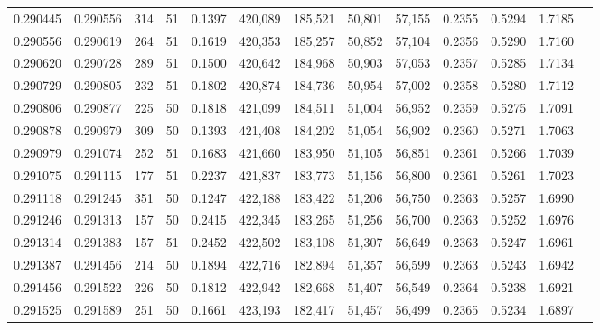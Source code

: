 \begin{tabular}{rrrrrrrrrrrrr}
0.290445 & 0.290556 &   314 &  51 &                                     0.1397 & 420,089 & 185,521 &  50,801 &  57,155 & 0.2355 & 0.5294 & 1.7185 \\
0.290556 & 0.290619 &   264 &  51 &                                     0.1619 & 420,353 & 185,257 &  50,852 &  57,104 & 0.2356 & 0.5290 & 1.7160 \\
0.290620 & 0.290728 &   289 &  51 &                                     0.1500 & 420,642 & 184,968 &  50,903 &  57,053 & 0.2357 & 0.5285 & 1.7134 \\
0.290729 & 0.290805 &   232 &  51 &                                     0.1802 & 420,874 & 184,736 &  50,954 &  57,002 & 0.2358 & 0.5280 & 1.7112 \\
0.290806 & 0.290877 &   225 &  50 &                                     0.1818 & 421,099 & 184,511 &  51,004 &  56,952 & 0.2359 & 0.5275 & 1.7091 \\
0.290878 & 0.290979 &   309 &  50 &                                     0.1393 & 421,408 & 184,202 &  51,054 &  56,902 & 0.2360 & 0.5271 & 1.7063 \\
0.290979 & 0.291074 &   252 &  51 &                                     0.1683 & 421,660 & 183,950 &  51,105 &  56,851 & 0.2361 & 0.5266 & 1.7039 \\
0.291075 & 0.291115 &   177 &  51 &                                     0.2237 & 421,837 & 183,773 &  51,156 &  56,800 & 0.2361 & 0.5261 & 1.7023 \\
0.291118 & 0.291245 &   351 &  50 &                                     0.1247 & 422,188 & 183,422 &  51,206 &  56,750 & 0.2363 & 0.5257 & 1.6990 \\
0.291246 & 0.291313 &   157 &  50 &                                     0.2415 & 422,345 & 183,265 &  51,256 &  56,700 & 0.2363 & 0.5252 & 1.6976 \\
0.291314 & 0.291383 &   157 &  51 &                                     0.2452 & 422,502 & 183,108 &  51,307 &  56,649 & 0.2363 & 0.5247 & 1.6961 \\
0.291387 & 0.291456 &   214 &  50 &                                     0.1894 & 422,716 & 182,894 &  51,357 &  56,599 & 0.2363 & 0.5243 & 1.6942 \\
0.291456 & 0.291522 &   226 &  50 &                                     0.1812 & 422,942 & 182,668 &  51,407 &  56,549 & 0.2364 & 0.5238 & 1.6921 \\
0.291525 & 0.291589 &   251 &  50 &                                     0.1661 & 423,193 & 182,417 &  51,457 &  56,499 & 0.2365 & 0.5234 & 1.6897 \\

\end{tabular}

